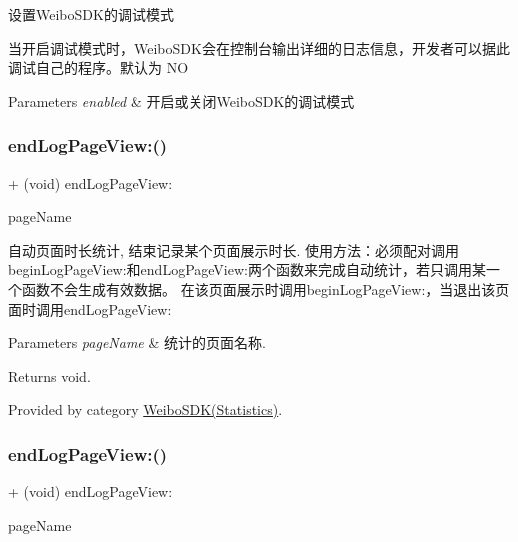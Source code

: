 设置\+Weibo\+S\+D\+K的调试模式

当开启调试模式时，\+Weibo\+S\+D\+K会在控制台输出详细的日志信息，开发者可以据此调试自己的程序。默认为 NO 
\begin{DoxyParams}{Parameters}
{\em enabled} & 开启或关闭\+Weibo\+S\+D\+K的调试模式 \\
\hline
\end{DoxyParams}
\mbox{\label{interface_weibo_s_d_k_aa9460b8e4fd90f3b437207c55ef2c40e}} 
\subsubsection{\texorpdfstring{end\+Log\+Page\+View\+:()}{endLogPageView:()}\hspace{0.1cm}{\footnotesize\ttfamily [1/3]}}
{\footnotesize\ttfamily + (void) end\+Log\+Page\+View\+: \begin{DoxyParamCaption}\item[{(N\+S\+String $\ast$)}]{page\+Name }\end{DoxyParamCaption}}

自动页面时长统计, 结束记录某个页面展示时长. 使用方法：必须配对调用begin\+Log\+Page\+View\+:和end\+Log\+Page\+View\+:两个函数来完成自动统计，若只调用某一个函数不会生成有效数据。 在该页面展示时调用begin\+Log\+Page\+View\+:，当退出该页面时调用end\+Log\+Page\+View\+: 
\begin{DoxyParams}{Parameters}
{\em page\+Name} & 统计的页面名称. \\
\hline
\end{DoxyParams}
\begin{DoxyReturn}{Returns}
void. 
\end{DoxyReturn}


Provided by category \mbox{\hyperlink{category_weibo_s_d_k_07_statistics_08_aa9460b8e4fd90f3b437207c55ef2c40e}{Weibo\+S\+D\+K(\+Statistics)}}.

\mbox{\label{interface_weibo_s_d_k_aa9460b8e4fd90f3b437207c55ef2c40e}} 
\subsubsection{\texorpdfstring{end\+Log\+Page\+View\+:()}{endLogPageView:()}\hspace{0.1cm}{\footnotesize\ttfamily [2/3]}}
{\footnotesize\ttfamily + (void) end\+Log\+Page\+View\+: \begin{DoxyParamCaption}\item[{(N\+S\+String $\ast$)}]{page\+Name }\end{DoxyParamCaption}}

